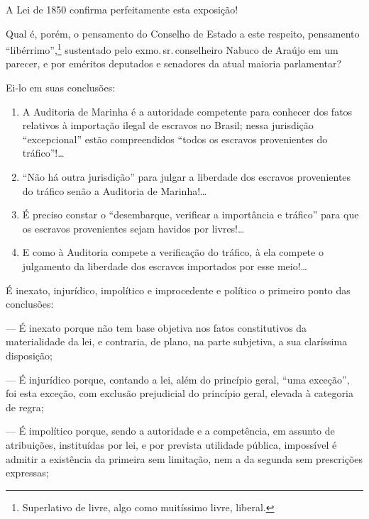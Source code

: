 A Lei de 1850 confirma perfeitamente esta exposição!

\asterisc

Qual é, porém, o pensamento do Conselho de Estado a este respeito,
pensamento ``libérrimo'',\footnote{Superlativo de livre,
  algo como muitíssimo livre, liberal.} sustentado pelo exmo.\,sr.\,conselheiro Nabuco de Araújo em um parecer, e por eméritos deputados e
senadores da atual maioria parlamentar?

Ei-lo em suas conclusões:

\begin{enumerate}[label=\arabic*º]
\item A Auditoria de Marinha é a autoridade competente para conhecer dos
fatos relativos à importação ilegal de escravos no Brasil; nessa
jurisdição ``excepcional'' estão compreendidos ``todos os escravos
provenientes do tráfico''!\ldots{}

\item ``Não há outra jurisdição'' para julgar a liberdade dos escravos
provenientes do tráfico senão a Auditoria de Marinha!\ldots{}

\item É preciso constar o ``desembarque, verificar a importância e tráfico''
para que os escravos provenientes sejam havidos por livres!\ldots{}

\item E como à Auditoria compete a verificação do tráfico, à ela compete o
julgamento da liberdade dos escravos importados por esse meio!\ldots{}
\end{enumerate}

É inexato, injurídico, impolítico e improcedente e político o primeiro
ponto das conclusões:

--- É inexato porque não tem base objetiva nos fatos constitutivos da
materialidade da lei, e contraria, de plano, na parte subjetiva, a sua
claríssima disposição;

--- É injurídico porque, contando a lei, além do princípio geral, ``uma
exceção'', foi esta exceção, com exclusão prejudicial do princípio geral,
elevada à categoria de regra;

--- É impolítico porque, sendo a autoridade e a competência, em assunto
de atribuições, instituídas por lei, e por prevista utilidade pública,
impossível é admitir a existência da primeira sem limitação, nem a da
segunda sem prescrições expressas;


